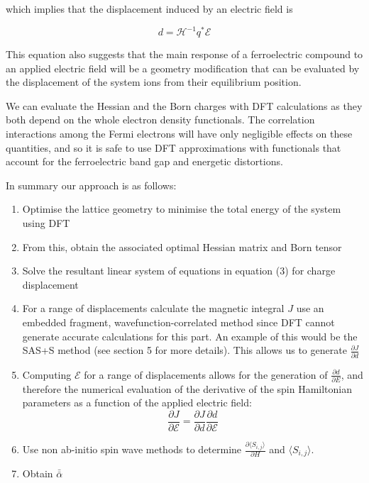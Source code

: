 \documentclass[10pt]{article}
\begin{document}
which implies that the displacement induced by an electric field is

$$ d = \mathcal{H}^{-1} q^* \mathcal{E} $$

This equation also suggests that the main response of a ferroelectric compound to an applied electric field will be a geometry modification that can be evaluated by the displacement of the system ions from their equilibrium position. 

We can evaluate the Hessian and the Born charges with DFT calculations as they both depend on the whole electron density functionals. The correlation interactions among the Fermi electrons will have only negligible effects on these quantities, and so it is safe to use DFT approximations with functionals that account for the ferroelectric band gap and energetic distortions.

In summary our approach is as follows:

\begin{enumerate}
	\item Optimise the lattice geometry to minimise the total energy of the system using DFT
	\item From this, obtain the associated optimal Hessian matrix and Born tensor
	\item Solve the resultant linear system of equations in equation (3) for charge displacement
	\item For a range of displacements calculate the magnetic integral $J$ use an embedded fragment, wavefunction-correlated method since DFT cannot generate accurate calculations for this part. An example of this would be the SAS+S method (see section 5 for more details). This allows us to generate $\frac{\partial J}{\partial d}$
	\item Computing $\mathcal{E}$ for a range of displacements allows for the generation of $\frac{\partial d}{\partial E}$, and therefore the numerical evaluation of the derivative of the spin Hamiltonian parameters as a function of the applied electric field:
	\begin{equation*}
	\dfrac{\partial J}{\partial \mathcal{E}} = \dfrac{\partial J}{\partial d}\dfrac{\partial d}{\partial \mathcal{E}}
	\end{equation*}
	\item Use non ab-initio spin wave methods to determine $\frac{\partial\langle S_{i,j}\rangle}{\partial H}$ and $\langle S_{i,j}\rangle$.
	\item Obtain $\bar{\bar{\alpha}}$
\end{enumerate}
\end{document}
